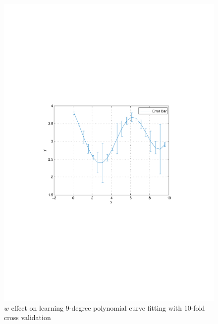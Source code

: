 \documentclass[letterpaper,12pt]{article}
\numberwithin{equation}{section}
\begin{document}
\begin{figure}[H]
\vspace{-8.5cm}
 
\centering
      \includegraphics[scale=0.8]{4}
\vspace{-8.3cm}
\caption{\label{fig:error_bar} 
$w$ effect on learning 9-degree polynomial curve fitting with 10-fold cross validation}
       
\end{figure}
\end{document}
